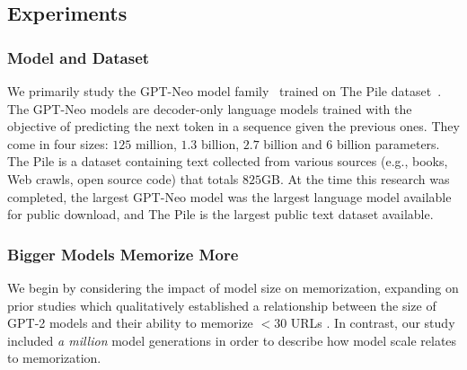 \subsection{Experiments}
\label{section:scaling_laws_experiments}

\subsubsection{Model and Dataset}
We primarily study the GPT-Neo model family~\citep{gpt-neo,gpt-j} trained on The Pile dataset~\citep{gao2020pile}.
The GPT-Neo models are decoder-only language models 
trained with the objective of predicting the next token in a sequence given the previous ones.
They come in four sizes: $125$ million, $1.3$ billion, $2.7$ billion and $6$ billion parameters. 
The Pile is a dataset containing text collected from various sources (e.g., books, Web crawls, open source code) that totals $825$GB.
%
At the time this research was completed, the largest GPT-Neo model was the largest language model available for public download, and The Pile is the largest public text dataset available.

\subsubsection{Bigger Models Memorize More}
\label{sec:modelsize}
We begin by considering the impact of model size on memorization,
expanding on prior studies which qualitatively established a relationship between the size of GPT-2 models and their
ability to memorize $<$30 URLs \citep{carlini2020extracting}.
%
In contrast, our study included \emph{a million} model generations in order to describe
how model scale relates to memorization.


